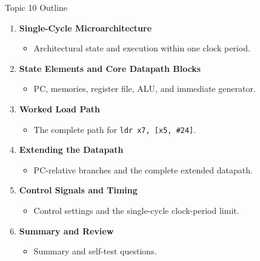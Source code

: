 \documentclass[aspectratio=169,11pt,t]{beamer}
\newcommand{\key}[1]{\textbf{#1}}
\newcommand{\code}[1]{\texttt{#1}}
\begin{document}
\begin{frame}{Topic 10 Outline}
\begin{enumerate}\setlength{\itemsep}{5pt}
  \item \key{Single-Cycle Microarchitecture}
  \begin{itemize}\item Architectural state and execution within one clock period.\end{itemize}
  \item \key{State Elements and Core Datapath Blocks}
  \begin{itemize}\item PC, memories, register file, ALU, and immediate generator.\end{itemize}
  \item \key{Worked Load Path}
  \begin{itemize}\item The complete path for \code{ldr x7, [x5, \#24]}.\end{itemize}
  \item \key{Extending the Datapath}
  \begin{itemize}\item PC-relative branches and the complete extended datapath.\end{itemize}
  \item \key{Control Signals and Timing}
  \begin{itemize}\item Control settings and the single-cycle clock-period limit.\end{itemize}
  \item \key{Summary and Review}
  \begin{itemize}\item Summary and self-test questions.\end{itemize}
\end{enumerate}
\end{frame}
\end{document}
